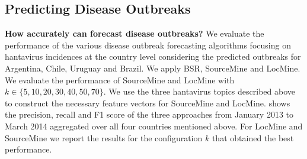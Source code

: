 \documentclass[conference]{IEEEtran}
\newcommand{\fullmodel}{{{\sf SourceMine}}\xspace}
\newcommand{\locationmodel}{{\sf LocMine}\xspace}
\begin{document}
\subsection{Predicting Disease Outbreaks}
\noindent\textbf{How accurately can {} forecast disease outbreaks?} We evaluate the performance of the various disease outbreak forecasting algorithms focusing on hantavirus incidences at the country level considering the predicted outbreaks for Argentina, Chile, Uruguay and Brazil.  We apply BSR,  \fullmodel and \locationmodel. We evaluate the performance of \fullmodel and \locationmodel with $k \in \{5,10,20,30,40,50,70\}$. We use the three hantavirus topics described above to construct the necessary feature vectors for \fullmodel and \locationmodel.   shows the precision, recall and F1 score  of the three approaches from January 2013 to March 2014 aggregated over all four countries mentioned above. For \locationmodel and \fullmodel we report the results for the configuration $k$ that obtained the best performance. 
\end{document}
